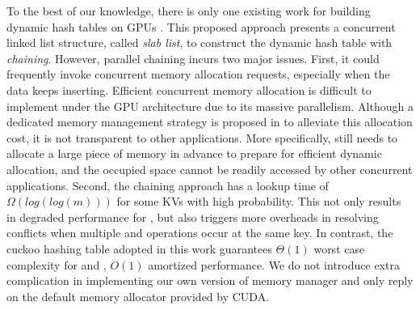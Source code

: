To the best of our knowledge, there is only one existing work for building dynamic hash tables on GPUs \cite{}.
This proposed approach presents a concurrent linked list structure, called \emph{slab list}, to construct the dynamic hash table with \emph{chaining}. 
However, parallel chaining incurs two major issues. 
First, it could frequently invoke concurrent memory allocation requests, especially when the data keeps inserting. Efficient concurrent memory allocation is difficult to implement under the GPU architecture due to its massive parallelism. Although a dedicated memory management strategy is proposed in \cite{} to alleviate this allocation cost, it is not transparent to other applications. More specifically, \cite{} still needs to allocate a large piece of memory in advance to prepare for efficient dynamic allocation, and the occupied space cannot be readily accessed by other concurrent applications. 
Second, the chaining approach has a lookup time of $\Omega(log(log(m)))$ for some KVs with high probability. This not only results in degraded performance for , but also triggers more overheads in resolving conflicts when multiple  and  operations occur at the same key.
In contrast, the cuckoo hashing table adopted in this work guarantees $\Theta(1)$ worst case complexity for  and , 
$O(1)$ amortized  performance. We do not introduce extra complication in implementing our own version of memory manager and only reply on the default memory allocator provided by CUDA. 